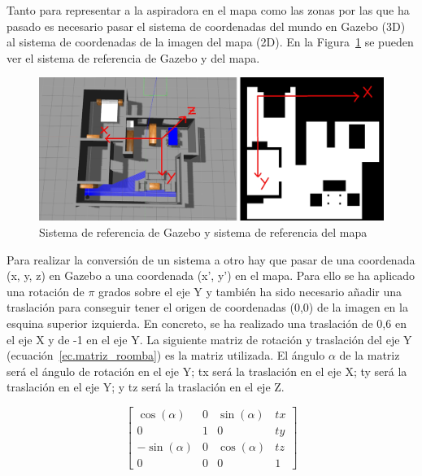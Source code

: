 Tanto para representar a la aspiradora en el mapa como las zonas por las que ha pasado es necesario pasar el sistema de coordenadas del mundo en Gazebo (3D) al sistema de coordenadas de la imagen del mapa (2D). En la Figura~\ref{fig.sistemaRef} se pueden ver el sistema de referencia de Gazebo y del mapa.

\begin{figure}[H]
  \begin{center}
    \includegraphics[width=1.0\textwidth]{figures/Vacuum/sistemaRef.jpg}
		\caption{Sistema de referencia de Gazebo y sistema de referencia del mapa}
		\label{fig.sistemaRef}
		\end{center}
\end{figure}


Para realizar la conversión de un sistema a otro hay que pasar de una coordenada (x, y, z) en Gazebo a una coordenada (x', y') en el mapa. Para ello se ha aplicado una rotación de \(\pi\) grados sobre el eje Y y también ha sido necesario añadir una traslación para conseguir tener el origen de coordenadas (0,0) de la imagen en la esquina superior izquierda. En concreto, se ha realizado una traslación de 0,6 en el eje X y de -1 en el eje Y. La siguiente matriz de rotación y traslación del eje Y (ecuación~\ref{ec.matriz_roomba}) es la matriz utilizada. El ángulo \(\alpha\) de la matriz será el ángulo de rotación en el eje Y; tx será la traslación en el eje X; ty será la traslación en el eje Y; y tz será la traslación en el eje Z. 

\begin{equation}
\label{ec.matriz_roomba}
\left[\begin{array}{cccc}
\cos(\alpha) & 0 & \sin(\alpha) & tx \\ 
0 & 1 & 0 & ty\\
-\sin(\alpha) & 0 & \cos(\alpha) & tz \\
0 & 0 & 0 & 1
\end{array}\right]
\end{equation}
\\


